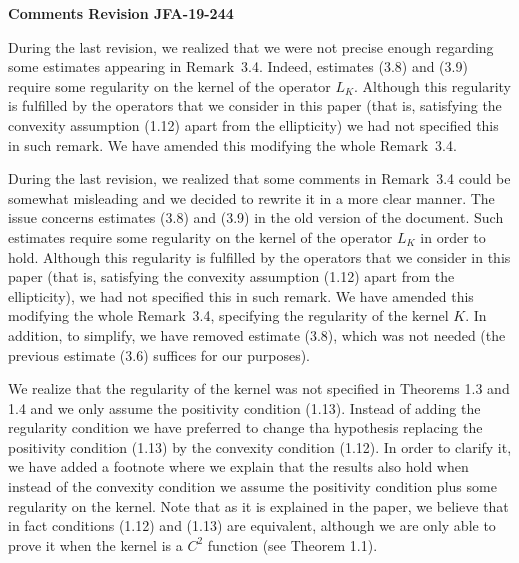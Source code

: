 \documentclass[]{report}
\title{}
\author{}
\begin{document}
	
	\begin{center}
		\textbf{	Comments Revision JFA-19-244}
	\end{center}
During the last revision, we realized that we were not precise enough regarding some estimates appearing in Remark~3.4. Indeed, estimates (3.8) and (3.9) require some regularity on the kernel of the operator $L_K$. Although this regularity is fulfilled by the operators that we consider in this paper (that is, satisfying the convexity assumption (1.12) apart from the ellipticity) we had not specified this in such remark. We have amended this modifying the whole Remark~3.4.


\vspace{2cm}


During the last revision, we realized that some comments in Remark~3.4 could be somewhat misleading and we decided to rewrite it in a more clear manner. The issue concerns estimates (3.8) and (3.9) in the old version of the document. Such estimates require some regularity on the kernel of the operator $L_K$ in order to hold. Although this regularity is fulfilled by the operators that we consider in this paper (that is, satisfying the convexity assumption (1.12) apart from the ellipticity), we had not specified this in such remark. We have amended this modifying the whole Remark~3.4, specifying the regularity of the kernel $K$. In addition, to simplify, we have removed estimate (3.8), which was not needed (the previous estimate (3.6) suffices for our purposes).



We realize that the regularity of the kernel was not specified in Theorems 1.3 and 1.4 and we only assume the positivity condition (1.13). Instead of adding the regularity condition we have preferred to change tha hypothesis replacing the positivity condition (1.13) by the convexity condition (1.12). In order to clarify it, we have added a footnote where we explain that the results also hold when instead of the convexity condition we assume the positivity condition plus some regularity on the kernel. Note that as it is explained in the paper, we believe that in fact conditions (1.12) and (1.13) are equivalent, although we are only able to prove it when the kernel is a $C^2$ function (see Theorem 1.1).  
\end{document}
